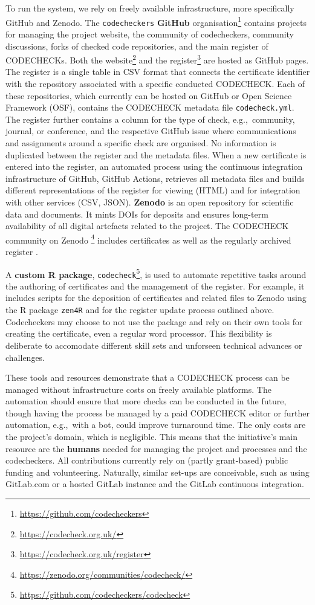 \documentclass[12pt]{article}
\begin{document}
To run the system, we rely on freely available infrastructure, more 
specifically GitHub and Zenodo.
The \texttt{codecheckers} \textbf{GitHub} organisation\footnote{
\url{https://github.com/codecheckers}} contains projects for managing the
project website, the community of codecheckers, community discussions,
forks of checked code repositories, and the main register of 
CODECHECKs. Both the website\footnote{
\url{https://codecheck.org.uk/}} and the register\footnote{
\url{https://codecheck.org.uk/register}} are hosted as GitHub
pages. The register is a single table in CSV format that
connects the certificate identifier with the repository associated with
a specific conducted CODECHECK. Each of these repositories, which 
currently can be hosted on GitHub or Open Science Framework (OSF), 
contains the CODECHECK metadata file \texttt{codecheck.yml}. The register
further contains a column for the type of check, e.g.,~community, journal,
or conference, and the respective GitHub issue where communications and 
assignments around a specific check are organised. No information is 
duplicated between the register and the metadata files. When a new
certificate is entered into the register, an automated process using the
continuous integration infrastructure of GitHub, GitHub Actions, retrieves
all metadata files and builds different representations of the register
for viewing (HTML) and for integration with other services (CSV, JSON).
\textbf{Zenodo} is an open repository for scientific data and documents. It
mints DOIs for deposits and ensures long-term availability of all digital
artefacts related to the project. The CODECHECK community on Zenodo
\footnote{\url{https://zenodo.org/communities/codecheck/}} includes 
certificates as well as the regularly archived register
\cite{codecheck_register_jan2021}.

A \textbf{custom R package}, \texttt{codecheck}\footnote{
\url{https://github.com/codecheckers/codecheck}}, is used to automate repetitive
tasks around the authoring of certificates and the management of the register.
For example, it includes scripts for the deposition of certificates and related 
files to Zenodo using the R package \texttt{zen4R} \cite{zen4r} and for the
register update process outlined above.
Codecheckers may choose to not use the package and rely on their own tools
for creating the certificate, even a regular word processor.
This flexibility is deliberate to accomodate different skill sets and unforseen technical advances or challenges.

These tools and resources demonstrate that a CODECHECK process can be
managed without infrastructure costs on freely available platforms.
The automation should ensure that more checks can
be conducted in the future, though having the process be managed by a paid CODECHECK
editor or further automation, e.g.,~with a bot, could improve turnaround time.
The only costs are the project's domain, which is negligible.
This means that the initiative's main resource are the \textbf{humans} needed
for managing the project and processes and the codecheckers.
All contributions currently rely on (partly grant-based) public funding
and volunteering.
Naturally, similar set-ups are conceivable, such as using GitLab.com or
a hosted GitLab instance and the GitLab continuous integration.
\end{document}
